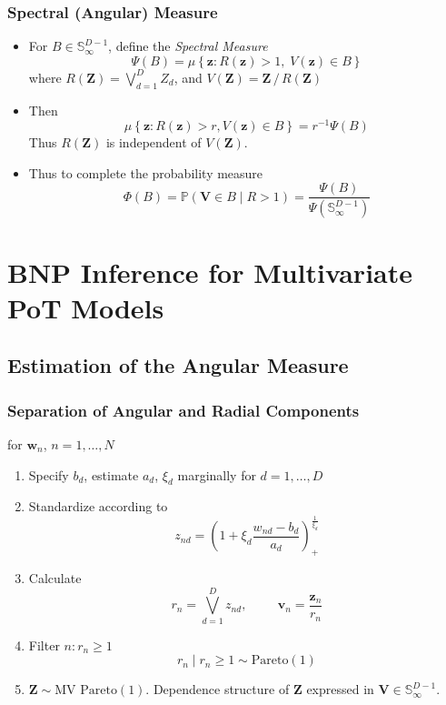 \documentclass[aspectratio=169,10pt]{beamer}
\begin{document}
\begin{frame}
    \frametitle{Spectral (Angular) Measure}
    \begin{itemize}
    \item For $B \in \mathbb{S}_{\infty}^{D-1}$, define the \emph{Spectral Measure}
    \[
        \Psi(B) = \mu\left\lbrace \bm{z} : R(\bm{z}) > 1,\;V(\bm{z}) \in B\right\rbrace
    \]
    where $R(\bm{Z}) = \bigvee_{d = 1}^D Z_d$,  and $V(\bm{Z}) = \bm{Z}\,/\,R(\bm{Z})$
    \item Then
    \[
        \mu\left\lbrace\bm{z} : R(\bm{z}) > r, V(\bm{z}) \in B\right\rbrace = r^{-1}\Psi(B)    
    \]
    Thus $R(\bm{Z})$ is independent of $V(\bm{Z})$.
    \item Thus to complete the probability measure
    \[
        \Phi(B) = \mathbb{P}\left(\bm{V} \in B \mid R > 1\right) = 
            \frac{\Psi(B)}{\Psi\left(\mathbb{S}_{\infty}^{D-1}\right)}
    \]
    \end{itemize}
\end{frame} %

\section[Inferring Extremal Dependence]{BNP Inference for Multivariate PoT Models}
\subsection{Estimation of the Angular Measure}
\begin{frame}
    \frametitle{Separation of Angular and Radial Components}
    {\small
    for $\bm{w}_n$, $n = 1,\ldots,N$
    \begin{enumerate}
        \item Specify $b_d$, estimate $a_d$, $\xi_d$    
            marginally for $d = 1,\ldots,D$
        \item Standardize according to
        \[
            z_{nd} = 
                \left(1 + \xi_d\frac{w_{nd} - b_d}{a_d}\right)_+^{\frac{1}{\xi_d}}        
        \]
        \item Calculate
        \[
            r_n = \bigvee_{d = 1}^D z_{nd},\hspace{1cm}\bm{v}_n = 
                \frac{\bm{z}_n}{r_n}
        \]
        \item Filter $n : r_n \geq 1$
        \[
            r_n \mid r_n \geq 1 \sim \text{Pareto}(1)
        \]
        \item $\bm{Z} \sim \text{MV Pareto}(1)$.  Dependence structure of 
            $\bm{Z}$ expressed in $\bm{V} \in \mathbb{S}_{\infty}^{D-1}$.
    \end{enumerate}
    }
\end{frame} %
\end{document}
